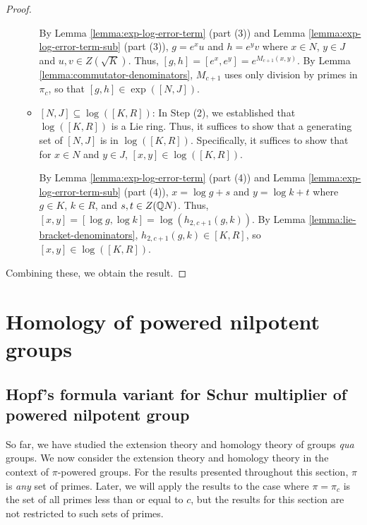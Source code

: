 \begin{proof}
\begin{enumerate}
\begin{itemize}
      By Lemma \ref{lemma:exp-log-error-term} (part (3)) and Lemma
      \ref{lemma:exp-log-error-term-sub} (part (3)), $g = e^xu$ and $h
      = e^yv$ where $x \in N$, $y \in J$ and $u,v \in
      Z(\sqrt{K})$. Thus, $[g,h] = [e^x,e^y] = e^{M_{c+1}(x,y)}$. By
      Lemma \ref{lemma:commutator-denominators}, $M_{c+1}$ uses only
      division by primes in $\pi_c$, so that $[g,h] \in \exp([N,J])$.

    \item $[N,J] \subseteq \log([K,R])$: In Step (2), we established
      that $\log([K,R])$ is a Lie ring. Thus, it suffices to show that
      a generating set of $[N,J]$ is in $\log([K,R])$.  Specifically,
      it suffices to show that for $x \in N$ and $y \in J$, $[x,y] \in
      \log([K,R])$.

      By Lemma \ref{lemma:exp-log-error-term} (part (4)) and Lemma
      \ref{lemma:exp-log-error-term-sub} (part (4)), $x = \log g + s$
      and $y = \log k + t$ where $g \in K$, $k \in R$, and $s,t \in
      Z(\mathbb{Q} N)$. Thus, $[x,y] = [\log g, \log k] =
      \log(h_{2,c+1}(g,k))$. By Lemma
      \ref{lemma:lie-bracket-denominators}, $h_{2,c+1}(g,k) \in
          [K,R]$, so $[x,y] \in \log([K,R])$.
    \end{itemize}
  \end{enumerate}

  Combining these, we obtain the result.
\end{proof}



\section{Homology of powered nilpotent groups}\label{sec:homology-of-powered-nilpotent-groups}

\subsection{Hopf's formula variant for Schur multiplier of powered nilpotent group}\label{sec:hopf-formula-pi-powered}

So far, we have studied the extension theory and homology theory of
groups {\em qua} groups. We now consider the extension theory and
homology theory in the context of $\pi$-powered groups. For the
results presented throughout this section, $\pi$ is {\em any} set of
primes. Later, we will apply the results to the case where $\pi =
\pi_c$ is the set of all primes less than or equal to $c$, but the
results for this section are not restricted to such sets of primes.

